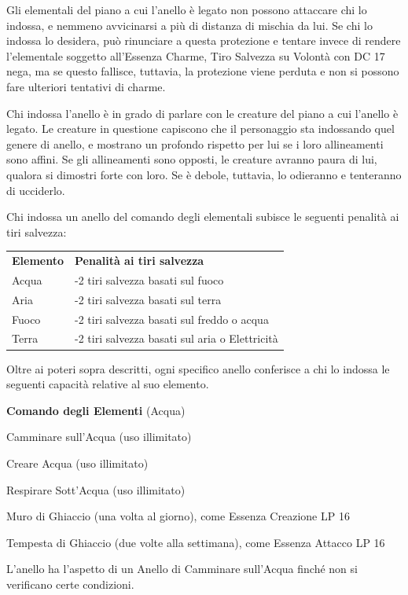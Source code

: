 \documentclass[a4paper,11pt,twoside,openany]{book}
\begin{document}
Gli elementali del piano a cui l'anello è legato non possono attaccare chi lo indossa, e nemmeno avvicinarsi a più di distanza di mischia da lui. Se chi lo indossa lo desidera, può rinunciare a questa protezione e tentare invece di rendere l'elementale soggetto all'Essenza Charme, Tiro Salvezza su Volontà con DC 17 nega, ma se questo fallisce, tuttavia, la protezione viene perduta e non si possono fare ulteriori tentativi di charme.

Chi indossa l'anello è in grado di parlare con le creature del piano a cui l'anello è legato. Le creature in questione capiscono che il personaggio sta indossando quel genere di anello, e mostrano un profondo rispetto per lui se i loro allineamenti sono affini. Se gli allineamenti sono opposti, le creature avranno paura di lui, qualora si dimostri forte con loro. Se è debole, tuttavia, lo odieranno e tenteranno di ucciderlo.

Chi indossa un anello del comando degli elementali subisce le seguenti
penalità ai tiri salvezza:

\begin{tabular}{ll}
	\toprule
	\textbf{Elemento} & \textbf{Penalità ai tiri salvezza}\\
	Acqua             & -2 tiri salvezza basati sul fuoco\\
	Aria              & -2 tiri salvezza basati sul terra\\
	Fuoco             & -2 tiri salvezza basati sul freddo o acqua\\
	Terra             & -2 tiri salvezza basati sul aria o Elettricità\\
\end{tabular}

Oltre ai poteri sopra descritti, ogni specifico anello conferisce
a chi lo indossa le seguenti capacità relative al suo elemento.

\textbf{Comando degli Elementi} (Acqua)

Camminare sull'Acqua (uso illimitato)

Creare Acqua (uso illimitato)

Respirare Sott'Acqua (uso illimitato)

Muro di Ghiaccio (una volta al giorno), come Essenza Creazione LP 16

Tempesta di Ghiaccio (due volte alla settimana), come Essenza Attacco LP 16

L'anello ha l'aspetto di un Anello di Camminare sull'Acqua finché non si verificano certe condizioni.
\end{document}
